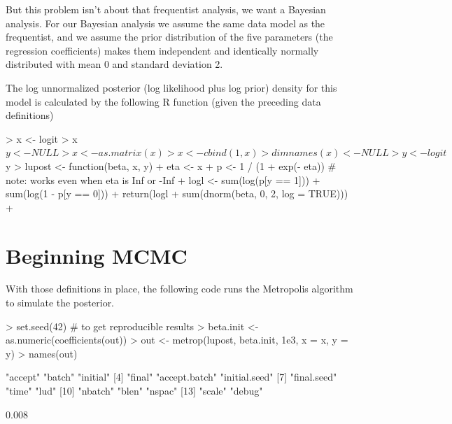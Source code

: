 \documentclass{article}
\begin{document}
But this problem isn't about that frequentist analysis, we want a Bayesian
analysis.  For our Bayesian analysis we assume the same data model as the
frequentist, and we assume the prior distribution of the five parameters
(the regression coefficients) makes them independent and identically
normally distributed with mean 0 and standard deviation 2.

The log unnormalized posterior (log likelihood plus log prior) density
for this model is calculated by
the following R function (given the preceding data definitions)
\begin{Schunk}
\begin{Sinput}
> x <- logit
> x$y <- NULL
> x <- as.matrix(x)
> x <- cbind(1, x)
> dimnames(x) <- NULL
> y <- logit$y
> lupost <- function(beta, x, y) {
+     eta <- x %
+     p <- 1 / (1 + exp(- eta))   # note: works even when eta is Inf or -Inf
+     logl <- sum(log(p[y == 1])) + sum(log(1 - p[y == 0]))
+     return(logl + sum(dnorm(beta, 0, 2, log = TRUE)))
+ }
\end{Sinput}
\end{Schunk}

\section{Beginning MCMC}

With those definitions in place, the following code runs the Metropolis
algorithm to simulate the posterior.
\begin{Schunk}
\begin{Sinput}
> set.seed(42)    # to get reproducible results
> beta.init <- as.numeric(coefficients(out))
> out <- metrop(lupost, beta.init, 1e3, x = x, y = y)
> names(out)
\end{Sinput}
\begin{Soutput}
 [1] "accept"       "batch"        "initial"     
 [4] "final"        "accept.batch" "initial.seed"
 [7] "final.seed"   "time"         "lud"         
[10] "nbatch"       "blen"         "nspac"       
[13] "scale"        "debug"       
\end{Soutput}
\begin{Soutput}
[1] 0.008
\end{Soutput}
\end{Schunk}
\end{document}
